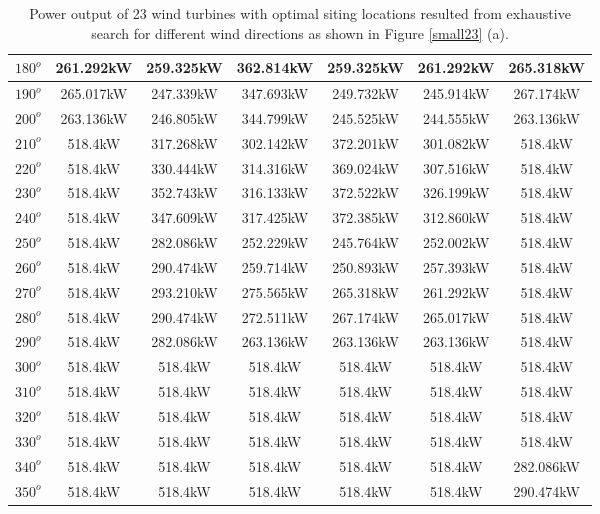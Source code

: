 \begin{table}[H]
\begin{tabular}{|c|c|c|c|c|c|c|}
		$180^o$	& 261.292kW	& 259.325kW	& 362.814kW	& 259.325kW	& 261.292kW	& 265.318kW	\\ \hline
		$190^o$	& 265.017kW	& 247.339kW	& 347.693kW	& 249.732kW	& 245.914kW	& 267.174kW	\\ \hline
		$200^o$	& 263.136kW	& 246.805kW	& 344.799kW	& 245.525kW	& 244.555kW	& 263.136kW	\\ \hline
		$210^o$	& 518.4kW	& 317.268kW	& 302.142kW	& 372.201kW	& 301.082kW	& 518.4kW	\\ \hline
		$220^o$	& 518.4kW	& 330.444kW	& 314.316kW	& 369.024kW	& 307.516kW	& 518.4kW	\\ \hline
		$230^o$	& 518.4kW	& 352.743kW	& 316.133kW	& 372.522kW	& 326.199kW	& 518.4kW	\\ \hline
		$240^o$	& 518.4kW	& 347.609kW	& 317.425kW	& 372.385kW	& 312.860kW	& 518.4kW	\\ \hline
		$250^o$	& 518.4kW	& 282.086kW	& 252.229kW	& 245.764kW	& 252.002kW	& 518.4kW	\\ \hline
		$260^o$	& 518.4kW	& 290.474kW	& 259.714kW	& 250.893kW	& 257.393kW	& 518.4kW	\\ \hline
		$270^o$	& 518.4kW	& 293.210kW	& 275.565kW	& 265.318kW	& 261.292kW	& 518.4kW	\\ \hline
		$280^o$	& 518.4kW	& 290.474kW	& 272.511kW	& 267.174kW	& 265.017kW	& 518.4kW	\\ \hline
		$290^o$	& 518.4kW	& 282.086kW	& 263.136kW	& 263.136kW	& 263.136kW	& 518.4kW	\\ \hline
		$300^o$	& 518.4kW	& 518.4kW	& 518.4kW	& 518.4kW	& 518.4kW	& 518.4kW	\\ \hline
		$310^o$	& 518.4kW	& 518.4kW	& 518.4kW	& 518.4kW	& 518.4kW	& 518.4kW	\\ \hline
		$320^o$	& 518.4kW	& 518.4kW	& 518.4kW	& 518.4kW	& 518.4kW	& 518.4kW	\\ \hline
		$330^o$	& 518.4kW	& 518.4kW	& 518.4kW	& 518.4kW	& 518.4kW	& 518.4kW	\\ \hline
		$340^o$	& 518.4kW	& 518.4kW	& 518.4kW	& 518.4kW	& 518.4kW	& 282.086kW	\\ \hline
		$350^o$	& 518.4kW	& 518.4kW	& 518.4kW	& 518.4kW	& 518.4kW	& 290.474kW	\\ \hline
        	\end{tabular}
        	\caption{Power output of 23 wind turbines with optimal siting locations resulted from exhaustive search for different wind directions as shown in Figure \ref{small23} (a).}
        	\label{table23a}
        \end{table}
